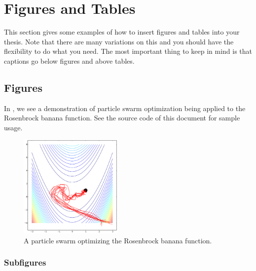 \documentclass[master]{thesis}
\begin{document}
\chapter{Figures and Tables}
\label{chap:figures.and.tables}

This section gives some examples of how to insert figures and tables into your thesis.  Note that there are many variations on this and you should have the flexibility to do what you need.  The most important thing to keep in mind is that captions go below figures and above tables.

\section{Figures}

In , we see a demonstration of particle swarm optimization being applied to the Rosenbrock banana function.  See the source code of this document for sample usage.

\begin{figure}[htp]
    \includegraphics[width=0.45\textwidth]{pso}

    \caption[Particle swarm optimization.]{A particle swarm optimizing the Rosenbrock banana function.}

    \label{fig:pso}
\end{figure}

\subsection{Subfigures}
\end{document}
